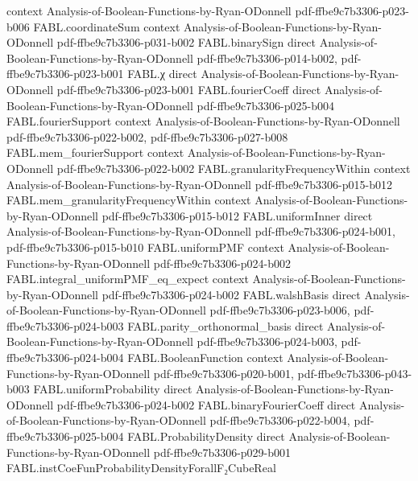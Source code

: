 \begin{theorem}
  {context}
  {Analysis-of-Boolean-Functions-by-Ryan-ODonnell}
  {pdf-ffbe9c7b3306-p023-b006}
\proofstep
  {FABL.coordinateSum}
  {context}
  {Analysis-of-Boolean-Functions-by-Ryan-ODonnell}
  {pdf-ffbe9c7b3306-p031-b002}
\proofstep
  {FABL.binarySign}
  {direct}
  {Analysis-of-Boolean-Functions-by-Ryan-ODonnell}
  {pdf-ffbe9c7b3306-p014-b002,
    pdf-ffbe9c7b3306-p023-b001}
\proofstep
  {FABL.χ}
  {direct}
  {Analysis-of-Boolean-Functions-by-Ryan-ODonnell}
  {pdf-ffbe9c7b3306-p023-b001}
\proofstep
  {FABL.fourierCoeff}
  {direct}
  {Analysis-of-Boolean-Functions-by-Ryan-ODonnell}
  {pdf-ffbe9c7b3306-p025-b004}
\proofstep
  {FABL.fourierSupport}
  {context}
  {Analysis-of-Boolean-Functions-by-Ryan-ODonnell}
  {pdf-ffbe9c7b3306-p022-b002,
    pdf-ffbe9c7b3306-p027-b008}
\proofstep
  {FABL.mem_fourierSupport}
  {context}
  {Analysis-of-Boolean-Functions-by-Ryan-ODonnell}
  {pdf-ffbe9c7b3306-p022-b002}
\proofstep
  {FABL.granularityFrequencyWithin}
  {context}
  {Analysis-of-Boolean-Functions-by-Ryan-ODonnell}
  {pdf-ffbe9c7b3306-p015-b012}
\proofstep
  {FABL.mem_granularityFrequencyWithin}
  {context}
  {Analysis-of-Boolean-Functions-by-Ryan-ODonnell}
  {pdf-ffbe9c7b3306-p015-b012}
\proofstep
  {FABL.uniformInner}
  {direct}
  {Analysis-of-Boolean-Functions-by-Ryan-ODonnell}
  {pdf-ffbe9c7b3306-p024-b001,
    pdf-ffbe9c7b3306-p015-b010}
\proofstep
  {FABL.uniformPMF}
  {context}
  {Analysis-of-Boolean-Functions-by-Ryan-ODonnell}
  {pdf-ffbe9c7b3306-p024-b002}
\proofstep
  {FABL.integral_uniformPMF_eq_expect}
  {context}
  {Analysis-of-Boolean-Functions-by-Ryan-ODonnell}
  {pdf-ffbe9c7b3306-p024-b002}
\proofstep
  {FABL.walshBasis}
  {direct}
  {Analysis-of-Boolean-Functions-by-Ryan-ODonnell}
  {pdf-ffbe9c7b3306-p023-b006,
    pdf-ffbe9c7b3306-p024-b003}
\proofstep
  {FABL.parity_orthonormal_basis}
  {direct}
  {Analysis-of-Boolean-Functions-by-Ryan-ODonnell}
  {pdf-ffbe9c7b3306-p024-b003,
    pdf-ffbe9c7b3306-p024-b004}
\proofstep
  {FABL.BooleanFunction}
  {context}
  {Analysis-of-Boolean-Functions-by-Ryan-ODonnell}
  {pdf-ffbe9c7b3306-p020-b001,
    pdf-ffbe9c7b3306-p043-b003}
\proofstep
  {FABL.uniformProbability}
  {direct}
  {Analysis-of-Boolean-Functions-by-Ryan-ODonnell}
  {pdf-ffbe9c7b3306-p024-b002}
\proofstep
  {FABL.binaryFourierCoeff}
  {direct}
  {Analysis-of-Boolean-Functions-by-Ryan-ODonnell}
  {pdf-ffbe9c7b3306-p022-b004,
    pdf-ffbe9c7b3306-p025-b004}
\proofstep
  {FABL.ProbabilityDensity}
  {direct}
  {Analysis-of-Boolean-Functions-by-Ryan-ODonnell}
  {pdf-ffbe9c7b3306-p029-b001}
\proofstep
  {FABL.instCoeFunProbabilityDensityForallF₂CubeReal}

\end{theorem}

